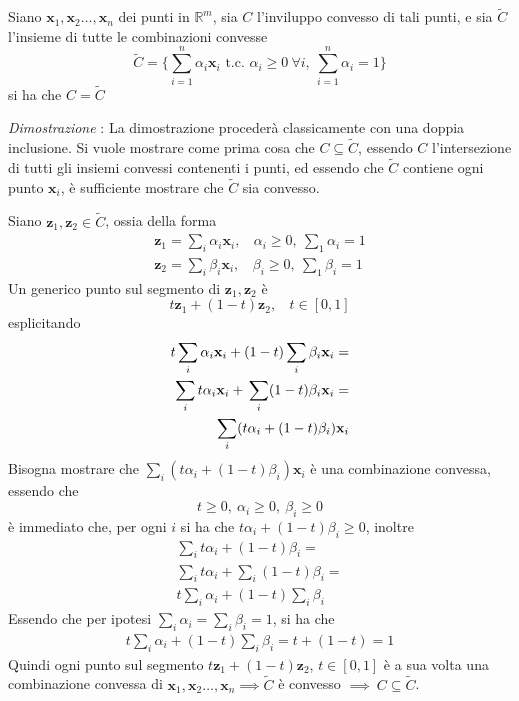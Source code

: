 \documentclass[10pt, letterpaper]{report}
\begin{document}
\begin{proposizione}
    Siano  $\mathbf{x}_1,\mathbf{x}_2\dots ,\mathbf{x}_n$ dei punti in $\mathbb R^m$, sia $C$ l'inviluppo convesso di tali punti, e sia $\tilde C$ l'insieme di tutte le combinazioni convesse $$\tilde{C} =
     \Big\{\sum_{i=1}^n \alpha_i\mathbf{x}_i \text{ t.c. }\alpha_i\ge 0 \ \forall i,\ \sum_{i=1}^n \alpha_i=1\Big\} $$
    si ha che $C=\tilde C$
\end{proposizione}
\textit{Dimostrazione} : La dimostrazione procederà classicamente con una doppia inclusione. Si vuole mostrare come prima cosa che $C\subseteq \tilde C$, essendo $C$ l'intersezione di tutti gli insiemi convessi contenenti i punti, ed essendo che $\tilde C$ contiene ogni punto $\mathbf x_i$, è sufficiente mostrare che $\tilde C$ sia convesso.

Siano $\mathbf z_1,\mathbf z_2\in\tilde C$, ossia della forma\begin{eqnarray*}
    \mathbf z_1 = \sum_i\alpha_i\mathbf x_i, \ \ \ \  \alpha_i\ge 0, \ \sum_1\alpha_i=1\\ 
    \mathbf z_2 = \sum_i\beta_i\mathbf x_i, \ \ \ \  \beta_i\ge 0, \ \sum_1\beta_i=1
\end{eqnarray*}
Un generico punto sul segmento di $\mathbf z_1,\mathbf z_2$ è 
$$ t\mathbf z_1+(1-t)\mathbf z_2, \ \ \ \ t\in[0,1]$$
esplicitando\begin{eqnarray}
    t\displaystyle  \sum_i\alpha_i\mathbf x_i+(1-t)\mathbf \displaystyle  \sum_i \beta_i\mathbf x_i=\\ \displaystyle  
    \displaystyle  \sum_i t\alpha_i\mathbf x_i+\mathbf \displaystyle  \sum_i (1-t)\beta_i\mathbf x_i=\\ \displaystyle  
    \sum_i(t\alpha_i+(1-t)\beta_i)\mathbf x_i
\end{eqnarray}
Bisogna mostrare che $\sum_i(t\alpha_i+(1-t)\beta_i)\mathbf x_i$ è una combinazione convessa, essendo che $$ t\ge 0, \ \alpha_i\ge 0, \ \beta_i\ge 0$$
è immediato che, per ogni $i$ si ha che $t\alpha_i+(1-t)\beta_i\ge 0$, inoltre \begin{eqnarray}
    \sum_i t\alpha_i+(1-t)\beta_i=\\ 
    \sum_it\alpha_i+\sum_i(1-t)\beta_i=\\ 
    t\sum_i\alpha_i+(1-t)\sum_i\beta_i
\end{eqnarray}
Essendo che per ipotesi $\sum_i\alpha_i=\sum_i\beta_i=1$, si ha che \begin{eqnarray}
    t\sum_i\alpha_i+(1-t)\sum_i\beta_i=t+(1-t)=1
\end{eqnarray}
Quindi ogni punto sul segmento $ t\mathbf z_1+(1-t)\mathbf z_2$, $t\in[0,1] $ è a sua volta una combinazione convessa di $\mathbf{x}_1,\mathbf{x}_2\dots ,\mathbf{x}_n\implies\tilde C$ è convesso $\implies \  C \subseteq \tilde C$.\bigskip 
\end{document}
